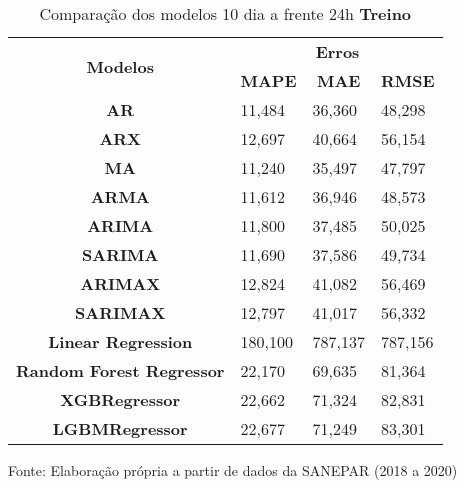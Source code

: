 \begin{table}[H]
	\centering
	\caption{Comparação dos modelos 10 dia a frente 24h \textbf{Treino} }\label{tb:10-24trn}
	\begin{tabular}{@{}clll@{}}
		\toprule
		\multirow{2}{*}{\textbf{Modelos}} & \multicolumn{3}{c}{\textbf{Erros}}                                                                       \\ \cmidrule(l){2-4} 
		& \multicolumn{1}{c}{\textbf{MAPE}} & \multicolumn{1}{c}{\textbf{MAE}} & \multicolumn{1}{c}{\textbf{RMSE}} \\ \hline
\textbf{AR}                       & 11,484                            & 36,360                           & 48,298                            \\
\textbf{ARX}                      & 12,697                            & 40,664                           & 56,154                            \\
\textbf{MA}                       & 11,240                            & 35,497                           & 47,797                            \\
\textbf{ARMA}                     & 11,612                            & 36,946                           & 48,573                            \\
\textbf{ARIMA}                    & 11,800                            & 37,485                           & 50,025                            \\
\textbf{SARIMA}                   & 11,690                            & 37,586                           & 49,734                            \\
\textbf{ARIMAX}                   & 12,824                            & 41,082                           & 56,469                            \\
\textbf{SARIMAX}                  & 12,797                            & 41,017                           & 56,332                            \\
\textbf{Linear Regression}        & 180,100                           & 787,137                          & 787,156                           \\
\textbf{Random Forest Regressor}  & 22,170                            & 69,635                           & 81,364                            \\
\textbf{XGBRegressor}             & 22,662                            & 71,324                           & 82,831                            \\
\textbf{LGBMRegressor}            & 22,677                            & 71,249                           & 83,301                            \\ \bottomrule
	\end{tabular}

Fonte: Elaboração própria a partir de dados da SANEPAR (2018 a 2020)
\end{table}


